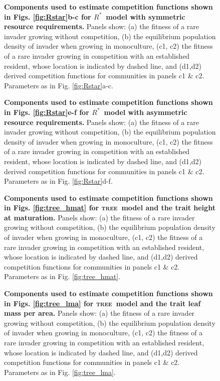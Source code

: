 \documentclass[a4paper,11pt]{article}
\newcommand{\Rstar}{\ensuremath{R^*}}
\newcommand{\TREE}{\textsc{tree}}
\begin{document}
\begin{figure}[h]
 \centering
 \caption{\textbf{Components used to estimate competition functions shown in Figs.
 \ref{fig:Rstar}b-c for \Rstar\ model with symmetric resource requirements.}
  Panels show: (a) the fitness of a rare invader growing without competition,
  (b) the equilibrium population density of invader when growing in monoculture,
  (c1, c2) the fitness of a rare invader growing in competition with an established
  resident, whose location is indicated by dashed line, and (d1,d2) derived competition
  functions for communities in panels  c1 \& c2. Parameters as in Fig.
  \ref{fig:Rstar}a-c.
  \label{fig:sm_rstar_components1}}
\end{figure}

\begin{figure}[h]
 \centering
 \caption{\textbf{Components used to estimate competition functions shown in Figs.
 \ref{fig:Rstar}e-f for \Rstar\ model with asymmetric resource requirements.}
  Panels show: (a) the fitness of a rare invader growing without competition,
  (b) the equilibrium population density of invader when growing in monoculture,
  (c1, c2) the fitness of a rare invader growing in competition with an established
  resident, whose location is indicated by dashed line, and (d1,d2) derived competition
  functions for communities in panels c1 \& c2. Parameters as in Fig.
  \ref{fig:Rstar}d-f.
  \label{fig:sm_rstar_components2}}
\end{figure}

\begin{figure}[h]
 \centering
 \caption{\textbf{Components used to estimate competition functions shown in Figs.
 \ref{fig:tree_hmat} for \TREE\ model and the trait height at maturation.}
  Panels show: (a) the fitness of a rare invader growing without competition,
  (b) the equilibrium population density of invader when growing in monoculture,
  (c1, c2) the fitness of a rare invader growing in competition with an established
  resident, whose location is indicated by dashed line, and (d1,d2) derived competition
  functions for communities in panels c1 \& c2. Parameters as in Fig.
  \ref{fig:tree_hmat}.
  \label{fig:sm_tree_hmat_components}}
\end{figure}

\begin{figure}[h]
 \centering
 \caption{\textbf{Components used to estimate competition functions shown in Figs.
 \ref{fig:tree_lma} for \TREE\ model and the trait leaf mass per area.}
  Panels show: (a) the fitness of a rare invader growing without competition,
  (b) the equilibrium population density of invader when growing in monoculture,
  (c1, c2) the fitness of a rare invader growing in competition with an established
  resident, whose location is indicated by dashed line, and (d1,d2) derived competition
  functions for communities in panels  c1 \& c2. Parameters as in Fig.
  \ref{fig:tree_lma}.
  \label{fig:sm_tree_lma_components}}
\end{figure}
\end{document}
